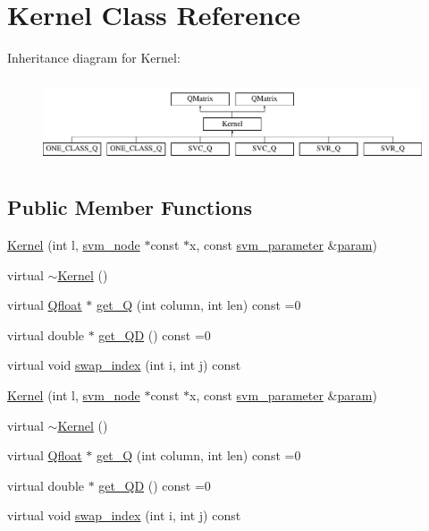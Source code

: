 \hypertarget{class_kernel}{\section{Kernel Class Reference}
\label{class_kernel}
}
Inheritance diagram for Kernel\-:\begin{figure}[H]
\begin{center}
\leavevmode
\includegraphics[height=2.500000cm]{class_kernel}
\end{center}
\end{figure}
\subsection*{Public Member Functions}
\begin{DoxyCompactItemize}
\item 
\hyperlink{class_kernel_a25ffaa0c67cc5b8c7fcdb6f97ca1725f}{Kernel} (int l, \hyperlink{structsvm__node}{svm\-\_\-node} $\ast$const $\ast$x, const \hyperlink{structsvm__parameter}{svm\-\_\-parameter} \&\hyperlink{_2svm-train_8cpp_abef2e39cc4fa6cc6870dddf9afa2cfad}{param})
\item 
virtual \hyperlink{class_kernel_a9c7407e3a0b1cb9b2f96e9a030187064}{$\sim$\-Kernel} ()
\item 
virtual \hyperlink{svm_8cpp_a8755d90a54ecfb8d15051af3e0542592}{Qfloat} $\ast$ \hyperlink{class_kernel_a30483355cbb8b5ab4e4c7a93bcef7429}{get\-\_\-\-Q} (int column, int len) const =0
\item 
virtual double $\ast$ \hyperlink{class_kernel_a5b7fde9af9d10f7b8f7105eb85bf3d5b}{get\-\_\-\-Q\-D} () const =0
\item 
virtual void \hyperlink{class_kernel_adca807c5584bc42fd098cd9eb1f19621}{swap\-\_\-index} (int i, int j) const 
\item 
\hyperlink{class_kernel_a25ffaa0c67cc5b8c7fcdb6f97ca1725f}{Kernel} (int l, \hyperlink{structsvm__node}{svm\-\_\-node} $\ast$const $\ast$x, const \hyperlink{structsvm__parameter}{svm\-\_\-parameter} \&\hyperlink{_2svm-train_8cpp_abef2e39cc4fa6cc6870dddf9afa2cfad}{param})
\item 
virtual \hyperlink{class_kernel_ab0aee98e27b5f821688faad456185b43}{$\sim$\-Kernel} ()
\item 
virtual \hyperlink{svm_8cpp_a8755d90a54ecfb8d15051af3e0542592}{Qfloat} $\ast$ \hyperlink{class_kernel_a30483355cbb8b5ab4e4c7a93bcef7429}{get\-\_\-\-Q} (int column, int len) const =0
\item 
virtual double $\ast$ \hyperlink{class_kernel_a5b7fde9af9d10f7b8f7105eb85bf3d5b}{get\-\_\-\-Q\-D} () const =0
\item 
virtual void \hyperlink{class_kernel_adca807c5584bc42fd098cd9eb1f19621}{swap\-\_\-index} (int i, int j) const 
\end{DoxyCompactItemize}
